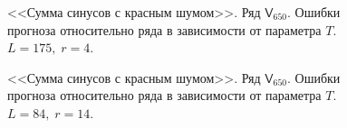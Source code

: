 \documentclass[specialist,
               substylefile = spbu.rtx,
               subf,href,colorlinks=true, 12p]{disser}
\begin{document}
\begin{figure}[H]
	\captionsetup{justification=centering}
	\caption{<<Сумма синусов с красным шумом>>. Ряд $\mathsf{V}_{650}$. Ошибки прогноза относительно ряда в зависимости от параметра $T$. $L = 175, \; r = 4$.}
	\label{serr_r4}
\end{figure}

\begin{figure}[H]
	\captionsetup{justification=centering}
	\caption{<<Сумма синусов с красным шумом>>. Ряд $\mathsf{V}_{650}$. Ошибки прогноза относительно ряда в зависимости от параметра $T$. $L = 84, \; r = 14$.}
	\label{serr_r14}
\end{figure}
\end{document}
